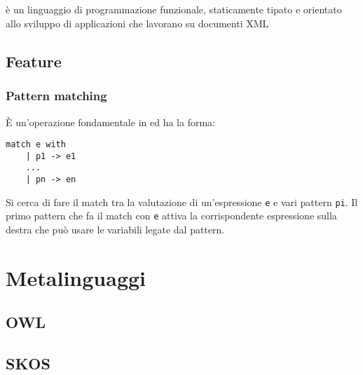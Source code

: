 \subsection{\cduce}
\cduce è un linguaggio di programmazione funzionale, staticamente tipato e orientato allo sviluppo di applicazioni che lavorano su documenti XML\cite{cduceLanguage}
\subsection{Feature}\label{fature_cduce}
\subsubsection{Pattern matching}
\label{CDucePattern}
È un'operazione fondamentale in \cduce ed ha la forma:
\begin{verbatim}
match e with
	| p1 -> e1
	...
	| pn -> en
\end{verbatim}
Si cerca di fare il match tra la valutazione di un'espressione \verb|e| e vari pattern \verb|pi|. Il primo pattern che fa il match con \verb|e| attiva la corrispondente espressione sulla destra che può usare le variabili legate dal pattern.


\section{Metalinguaggi}

\subsection{OWL}

\subsection{SKOS}
